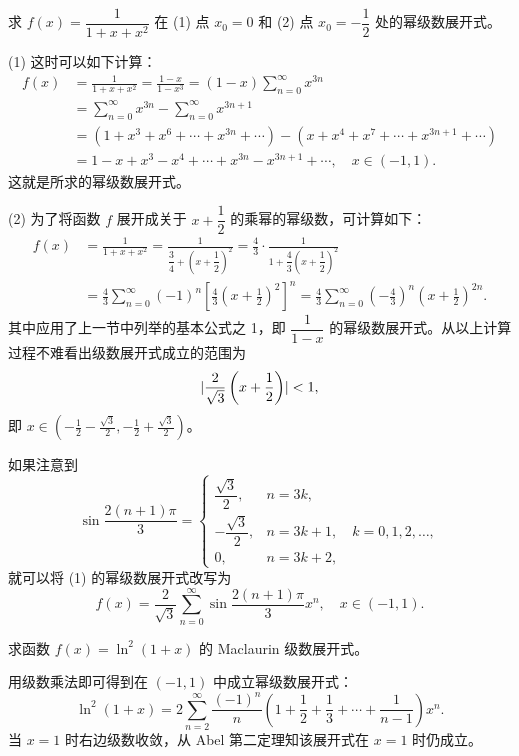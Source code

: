 \begin{xexample}[14.4.3]
求 $f(x)=\dfrac1{1+x+x^2}$ 在 (1) 点 $x_0=0$ 和 (2) 点 $x_0=-\dfrac12$ 处的幂级数展开式。
\end{xexample}
\begin{xsolution}
(1) 这时可以如下计算：
\[
\begin{aligned}
  f(x)&=\frac1{1+x+x^2}=\frac{1-x}{1-x^3}=(1-x)\sum_{n=0}^{\infty}x^{3n}\\
  &=\sum_{n=0}^{\infty}x^{3n}-\sum_{n=0}^{\infty}x^{3n+1}\\
  &=(1+x^3+x^6+\cdots+x^{3n}+\cdots)-(x+x^4+x^7+\cdots+x^{3n+1}+\cdots)\\
  &=1-x+x^3-x^4+\cdots+x^{3n}-x^{3n+1}+\cdots,\quad x\in(-1,1).
\end{aligned}
\]
这就是所求的幂级数展开式。

(2) 为了将函数 $f$ 展开成关于 $x+\dfrac12$ 的乘幂的幂级数，可计算如下：
\[
\begin{aligned}
  f(x)&=\frac1{1+x+x^2}=\frac1{\dfrac34+\left(x+\dfrac12\right)^2}=\frac43\cdot\frac1{1+\dfrac43\left(x+\dfrac12\right)^2}\\
  &=\frac43\sum_{n=0}^{\infty}(-1)^n\left[\frac43\left(x+\frac12\right)^2\right]^n
  =\frac43\sum_{n=0}^{\infty}\left(-\frac43\right)^n\left(x+\frac12\right)^{2n}.
\end{aligned}
\]
其中应用了上一节中列举的基本公式之 1，即 $\dfrac1{1-x}$ 的幂级数展开式。从以上计算过程不难看出级数展开式成立的范围为
\[
  \lvert\frac2{\sqrt3}\left(x+\frac12\right)\rvert<1,
\]
即 $\displaystyle x\in\left(-\frac12-\frac{\sqrt3}{2},-\frac12+\frac{\sqrt3}{2}\right)$。
\end{xsolution}

\begin{xremark}
如果注意到
\[
  \sin\frac{2(n+1)\pi}{3}=
  \begin{cases}
    \dfrac{\sqrt3}{2},&n=3k,\\[3pt]
    -\dfrac{\sqrt3}{2},&n=3k+1,\quad k=0,1,2,\ldots,\\[3pt]
    0,&n=3k+2,
  \end{cases}
\]
就可以将 (1) 的幂级数展开式改写为
\[
  f(x)=\frac2{\sqrt3}\sum_{n=0}^{\infty}\sin\frac{2(n+1)\pi}{3}x^n,\quad x\in(-1,1).
\]
\end{xremark}

\begin{xexample}[14.4.4]
求函数 $f(x)=\ln^2(1+x)$ 的 Maclaurin 级数展开式。
\end{xexample}
\begin{xsolution}
用级数乘法即可得到在 $(-1,1)$ 中成立幂级数展开式：
\begin{equation}
  \ln^2(1+x)=2\sum_{n=2}^{\infty}\frac{(-1)^n}{n}\left(1+\frac12+\frac13+\cdots+\frac1{n-1}\right)x^n.
  \tag{14.29}
  \label{eq:14.29}
\end{equation}
当 $x=1$ 时右边级数收敛，从 Abel 第二定理知该展开式在 $x=1$ 时仍成立。
\end{xsolution}

